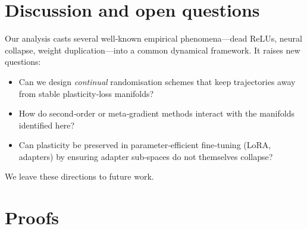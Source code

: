 \documentclass[11pt]{article}
\begin{document}
\section{Discussion and open questions}
Our analysis casts several well‑known empirical phenomena—dead ReLUs, neural collapse, weight duplication—into a common dynamical framework.  It raises new questions:
\begin{itemize}[nosep]
    \item Can we design \emph{continual} randomisation schemes that keep trajectories away from stable plasticity‑loss manifolds?
    \item How do second‑order or meta‑gradient methods interact with the manifolds identified here?
    \item Can plasticity be preserved in parameter‑efficient fine‑tuning (LoRA, adapters) by ensuring adapter sub‑spaces do not themselves collapse?
\end{itemize}
We leave these directions to future work.



\newpage
\appendix 
\section{Proofs }
\end{document}
